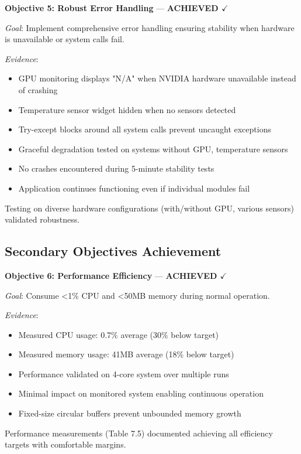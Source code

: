 \documentclass[12pt,a4paper,oneside]{report}
\begin{document}
\textbf{Objective 5: Robust Error Handling} --- \textbf{ACHIEVED $\checkmark$}

\textit{Goal}: Implement comprehensive error handling ensuring stability when hardware is unavailable or system calls fail.

\textit{Evidence}:
\begin{itemize}
    \item GPU monitoring displays "N/A" when NVIDIA hardware unavailable instead of crashing
    \item Temperature sensor widget hidden when no sensors detected
    \item Try-except blocks around all system calls prevent uncaught exceptions
    \item Graceful degradation tested on systems without GPU, temperature sensors
    \item No crashes encountered during 5-minute stability tests
    \item Application continues functioning even if individual modules fail
\end{itemize}

Testing on diverse hardware configurations (with/without GPU, various sensors) validated robustness.

\subsection{Secondary Objectives Achievement}

\textbf{Objective 6: Performance Efficiency} --- \textbf{ACHIEVED $\checkmark$}

\textit{Goal}: Consume <1\% CPU and <50MB memory during normal operation.

\textit{Evidence}:
\begin{itemize}
    \item Measured CPU usage: 0.7\% average (30\% below target)
    \item Measured memory usage: 41MB average (18\% below target)
    \item Performance validated on 4-core system over multiple runs
    \item Minimal impact on monitored system enabling continuous operation
    \item Fixed-size circular buffers prevent unbounded memory growth
\end{itemize}

Performance measurements (Table 7.5) documented achieving all efficiency targets with comfortable margins.
\end{document}

